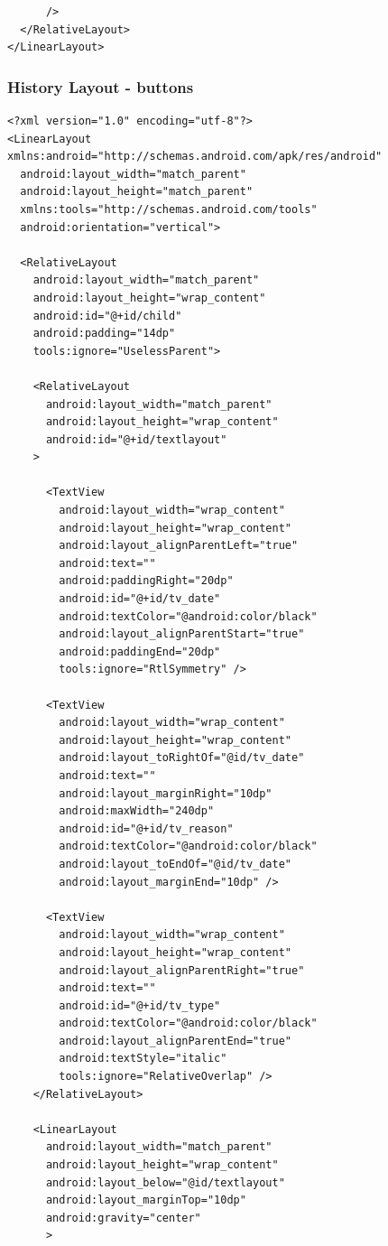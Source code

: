 \documentclass[11pt, a4paper]{article}
\begin{document}
\begin{appendices}
\begin{lstlisting}
      />
  </RelativeLayout>
</LinearLayout>
\end{lstlisting}
\subsubsection{History Layout - buttons}
\begin{lstlisting}
<?xml version="1.0" encoding="utf-8"?>
<LinearLayout xmlns:android="http://schemas.android.com/apk/res/android"
  android:layout_width="match_parent"
  android:layout_height="match_parent"
  xmlns:tools="http://schemas.android.com/tools"
  android:orientation="vertical">

  <RelativeLayout
    android:layout_width="match_parent"
    android:layout_height="wrap_content"
    android:id="@+id/child"
    android:padding="14dp"
    tools:ignore="UselessParent">

    <RelativeLayout
      android:layout_width="match_parent"
      android:layout_height="wrap_content"
      android:id="@+id/textlayout"
    >

      <TextView
        android:layout_width="wrap_content"
        android:layout_height="wrap_content"
        android:layout_alignParentLeft="true"
        android:text=""
        android:paddingRight="20dp"
        android:id="@+id/tv_date"
        android:textColor="@android:color/black"
        android:layout_alignParentStart="true"
        android:paddingEnd="20dp"
        tools:ignore="RtlSymmetry" />

      <TextView
        android:layout_width="wrap_content"
        android:layout_height="wrap_content"
        android:layout_toRightOf="@id/tv_date"
        android:text=""
        android:layout_marginRight="10dp"
        android:maxWidth="240dp"
        android:id="@+id/tv_reason"
        android:textColor="@android:color/black"
        android:layout_toEndOf="@id/tv_date"
        android:layout_marginEnd="10dp" />

      <TextView
        android:layout_width="wrap_content"
        android:layout_height="wrap_content"
        android:layout_alignParentRight="true"
        android:text=""
        android:id="@+id/tv_type"
        android:textColor="@android:color/black"
        android:layout_alignParentEnd="true"
        android:textStyle="italic"
        tools:ignore="RelativeOverlap" />
    </RelativeLayout>

    <LinearLayout
      android:layout_width="match_parent"
      android:layout_height="wrap_content"
      android:layout_below="@id/textlayout"
      android:layout_marginTop="10dp"
      android:gravity="center"
      >


\end{lstlisting}
\end{appendices}
\end{document}

